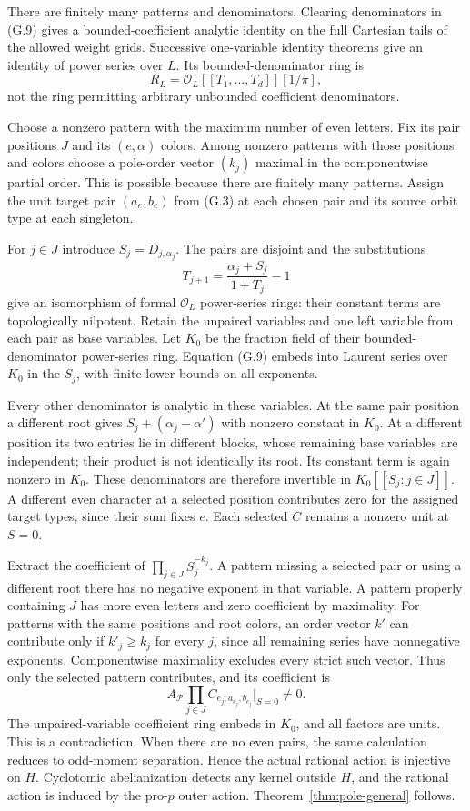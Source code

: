There are finitely many patterns and denominators. Clearing denominators in (G.9) gives a bounded-coefficient analytic identity on the full Cartesian tails of the allowed weight grids. Successive one-variable identity theorems give an identity of power series over $L$. Its bounded-denominator ring is
\[
 R_L=\mathcal O_L[[T_1,\ldots,T_d]][1/\pi],
\]
not the ring permitting arbitrary unbounded coefficient denominators.

Choose a nonzero pattern with the maximum number of even letters. Fix its pair positions $J$ and its $(e,\alpha)$ colors. Among nonzero patterns with those positions and colors choose a pole-order vector $(k_j)$ maximal in the componentwise partial order. This is possible because there are finitely many patterns. Assign the unit target pair $(a_e,b_e)$ from (G.3) at each chosen pair and its source orbit type at each singleton.

For $j\in J$ introduce $S_j=D_{j,\alpha_j}$. The pairs are disjoint and the substitutions
\[
 T_{j+1}=\frac{\alpha_j+S_j}{1+T_j}-1
\]
give an isomorphism of formal $\mathcal O_L$ power-series rings: their constant terms are topologically nilpotent. Retain the unpaired variables and one left variable from each pair as base variables. Let $K_0$ be the fraction field of their bounded-denominator power-series ring. Equation (G.9) embeds into Laurent series over $K_0$ in the $S_j$, with finite lower bounds on all exponents.

Every other denominator is analytic in these variables. At the same pair position a different root gives $S_j+(\alpha_j-\alpha')$ with nonzero constant in $K_0$. At a different position its two entries lie in different blocks, whose remaining base variables are independent; their product is not identically its root. Its constant term is again nonzero in $K_0$. These denominators are therefore invertible in $K_0[[S_j:j\in J]]$. A different even character at a selected position contributes zero for the assigned target types, since their sum fixes $e$. Each selected $C$ remains a nonzero unit at $S=0$.

Extract the coefficient of $\prod_{j\in J}S_j^{-k_j}$. A pattern missing a selected pair or using a different root there has no negative exponent in that variable. A pattern properly containing $J$ has more even letters and zero coefficient by maximality. For patterns with the same positions and root colors, an order vector $k'$ can contribute only if $k'_j\ge k_j$ for every $j$, since all remaining series have nonnegative exponents. Componentwise maximality excludes every strict such vector. Thus only the selected pattern contributes, and its coefficient is
\[
 A_{\mathcal P}\prod_{j\in J}
 C_{e_j;a_{e_j},b_{e_j}}\big|_{S=0}\ne0.
\]
The unpaired-variable coefficient ring embeds in $K_0$, and all factors are units. This is a contradiction. When there are no even pairs, the same calculation reduces to odd-moment separation. Hence the actual rational action is injective on $H$. Cyclotomic abelianization detects any kernel outside $H$, and the rational action is induced by the pro-$p$ outer action. Theorem~\ref{thm:pole-general} follows.

